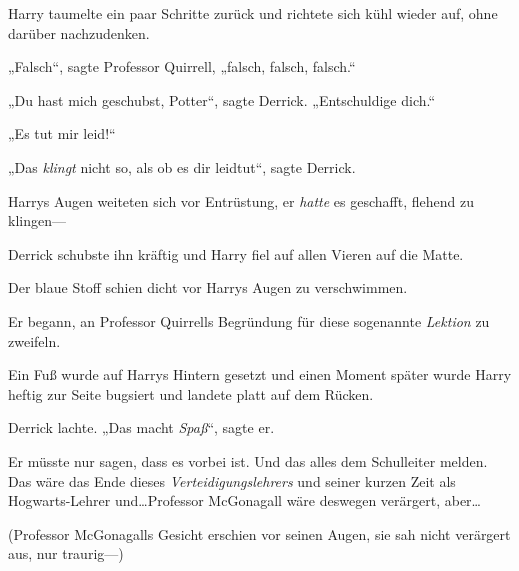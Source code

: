 Harry taumelte ein paar Schritte zurück und richtete sich kühl wieder auf, ohne darüber nachzudenken.

„Falsch“, sagte Professor Quirrell, „falsch, falsch, falsch.“

„Du hast mich geschubst, Potter“, sagte Derrick. „Entschuldige dich.“

„Es tut mir leid!“

„Das \emph{klingt} nicht so, als ob es dir leidtut“, sagte Derrick.

Harrys Augen weiteten sich vor Entrüstung, er \emph{hatte} es geschafft, flehend zu klingen—

Derrick schubste ihn kräftig und Harry fiel auf allen Vieren auf die Matte.

Der blaue Stoff schien dicht vor Harrys Augen zu verschwimmen.

Er begann, an Professor Quirrells Begründung für diese sogenannte \emph{Lektion} zu zweifeln.

Ein Fuß wurde auf Harrys Hintern gesetzt und einen Moment später wurde Harry heftig zur Seite bugsiert und landete platt auf dem Rücken.

Derrick lachte. „Das macht \emph{Spaß}“, sagte er.

Er müsste nur sagen, dass es vorbei ist. Und das alles dem Schulleiter melden. Das wäre das Ende dieses \emph{Verteidigungslehrers} und seiner kurzen Zeit als Hogwarts-Lehrer und…Professor McGonagall wäre deswegen verärgert, aber…

(Professor McGonagalls Gesicht erschien vor seinen Augen, sie sah nicht verärgert aus, nur traurig—)

